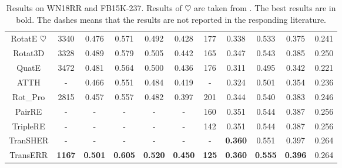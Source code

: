 \documentclass[11pt]{article}
\begin{document}
\begin{table}[!htb]
{\begin{tabular}{ccccccccccc}
			RotatE $\heartsuit $   & 3340                                & 0.476                                  & 0.571          & 0.492          & 0.428          & 177          & 0.338          & 0.533          & 0.375          & 0.241          \\
			Rotat3D    & 3328                                & 0.489                                  & 0.579          & 0.505          & 0.442          & 165          & 0.347          & 0.543          & 0.385          & 0.250          \\
			QuatE              & 3472                                & 0.481                                  & 0.564          & 0.500          & 0.436          & 176          & 0.311          & 0.495          & 0.342          & 0.221          \\
			ATTH               & -                                   & 0.466                                  & 0.551          & 0.484          & 0.419          & -            & 0.324          & 0.501          & 0.354          & 0.236          \\
			Rot\_Pro           & 2815                                & 0.457                                  & 0.557          & 0.482          & 0.397          & 201          & 0.344          & 0.540          & 0.383          & 0.246          \\
			PairRE             &     -                               & -                                      & -              & -              & -              & 160          & 0.351          & 0.544          & 0.387          & 0.256          \\ 
			TripleRE   & -                                     & -                                   & -              & -              & -              & 142   & 0.351          & 0.544          & 0.387          & 0.256          \\
			TranSHER   & -                                     & -                                   & -              & -              & -              & -   & \textbf{0.360}          & 0.551          & 0.397          & 0.264          \\  \hline
			
			
			TransERR            & \textbf{1167}                       & \textbf{0.501}                         & \textbf{0.605} & \textbf{0.520} & \textbf{0.450} & \textbf{125} & \textbf{0.360} & \textbf{0.555} & \textbf{0.396} & 0.264          \\ \hline
		\end{tabular}}
	\caption{Results on WN18RR and FB15K-237. Results of $\heartsuit $ are taken from  \citet{31sun2019rotate}. The best results are in bold. The dashes means that the results are not reported in the responding literature.}

	\label{tab:wn18rr+fb237}
\end{table}
\end{document}
